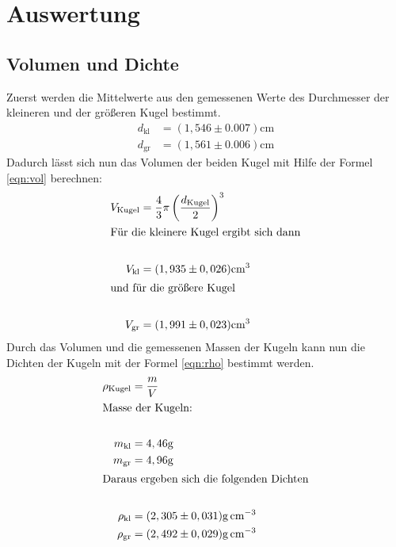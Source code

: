 \section{Auswertung}
\label{sec:Auswertung}
\subsection{Volumen und Dichte}
\label{sec:Vol und Dich}
Zuerst werden die Mittelwerte aus den gemessenen Werte des Durchmesser der kleineren und der größeren Kugel bestimmt.
\begin{align}
d_\mathrm{kl}&=(1,546\pm0.007)\si{\centi\meter}\\
d_\mathrm{gr}&=(1,561\pm0.006)\si{\centi\meter}
\end{align}
Dadurch lässt sich nun das Volumen der beiden Kugel mit Hilfe der Formel \eqref{eqn:vol}
berechnen:
\begin{align}
V_{\mathrm{Kugel}}&=\frac{4}{3}\pi \left(\frac{d_{\mathrm{Kugel}}}{2}\right)^3\label{eqn:vol}\\
\intertext{Für die kleinere Kugel ergibt sich dann}\\
V_{\mathrm{kl}}&=(1,935\pm0,026)\si{\cubic\centi\meter}\\
\intertext{und für die größere Kugel}\\
V_\mathrm{gr}&=(1,991\pm0,023)\si{\cubic\centi\meter}\\
\end{align}
Durch das Volumen und die gemessenen Massen der Kugeln kann nun die Dichten der Kugeln mit der Formel \eqref{eqn:rho}
bestimmt werden.
\begin{align}
\rho_{\mathrm{Kugel}}&=\frac{m}{V}\label{eqn:rho}\\
\intertext{Masse der Kugeln:}\\
m_{\mathrm{kl}}&=4,46\si{\gram}\\
m_{\mathrm{gr}}&=4,96\si{\gram}\\
\intertext{Daraus ergeben sich die folgenden Dichten}\\
\rho_{\mathrm{kl}}&=(2,305\pm0,031)\si{\gram\per\cubic\centi\meter}\\
\rho_{\mathrm{gr}}&=(2,492\pm0,029)\si{\gram\per\cubic\centi\meter}
\end{align}
